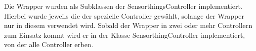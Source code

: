 Die Wrapper wurden als Subklassen der SensorthingsController implementiert.
Hierbei wurde jeweils die der spezielle Controller gewählt, solange der Wrapper nur in diesem verwendet wird.
Sobald der Wrapper in zwei oder mehr Controllern zum Einsatz kommt wird er in der Klasse SensorthingController implementiert, von der alle Controller erben.